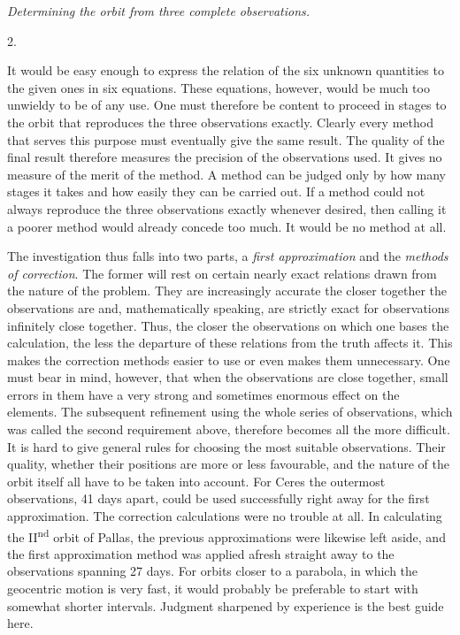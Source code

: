 %
\begin{center}\emph{Determining the orbit from three complete observations.}\end{center}
\begin{center}2.\end{center}
It would be easy enough to express the relation of the six unknown quantities to the given ones in six equations. These equations, however, would be much too unwieldy to be of any use. One must therefore be content to proceed in stages to the orbit that reproduces the three observations exactly. Clearly every method that serves this purpose must eventually give the same result. The quality of the final result therefore measures the precision of the observations used. It gives no measure of the merit of the method. A method can be judged only by how many stages it takes and how easily they can be carried out. If a method could not always reproduce the three observations exactly whenever desired, then calling it a poorer method would already concede too much. It would be no method at all.

The investigation thus falls into two parts, a \emph{first approximation} and the \emph{methods of correction}. The former will rest on certain nearly exact relations drawn from the nature of the problem. They are increasingly accurate the closer together the observations are and, mathematically speaking, are strictly exact for observations infinitely close together. Thus, the closer the observations on which one bases the calculation, the less the departure of these relations from the truth affects it. This makes the correction methods easier to use or even makes them unnecessary. One must bear in mind, however, that when the observations are close together, small errors in them have a very strong and sometimes enormous effect on the elements. The subsequent refinement using the whole series of observations, which was called the second requirement above, therefore becomes all the more difficult. It is hard to give general rules for choosing the most suitable observations. Their quality, whether their positions are more or less favourable, and the nature of the orbit itself all have to be taken into account. For Ceres the outermost observations, 41 days apart, could be used successfully right away for the first approximation. The correction calculations were no trouble at all. In calculating the II\textsuperscript{nd} orbit of Pallas, the previous approximations were likewise left aside, and the first
%
approximation method was applied afresh straight away to the observations spanning 27 days. For orbits closer to a parabola, in which the geocentric motion is very fast, it would probably be preferable to start with somewhat shorter intervals. Judgment sharpened by experience is the best guide here.

